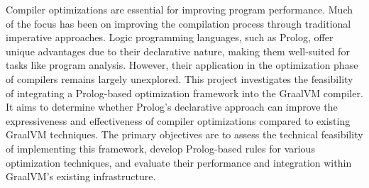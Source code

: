 Compiler optimizations are essential for improving program performance. Much of the focus has been on improving the compilation process through traditional imperative approaches. Logic programming languages, such as Prolog, offer unique advantages due to their declarative nature, making them well-suited for tasks like program analysis. However, their application in the optimization phase of compilers remains largely unexplored. This project investigates the feasibility of integrating a Prolog-based optimization framework into the GraalVM compiler. It aims to determine whether Prolog’s declarative approach can improve the expressiveness and effectiveness of compiler optimizations compared to existing GraalVM techniques. The primary objectives are to assess the technical feasibility of implementing this framework, develop Prolog-based rules for various optimization techniques, and evaluate their performance and integration within GraalVM's existing infrastructure. 